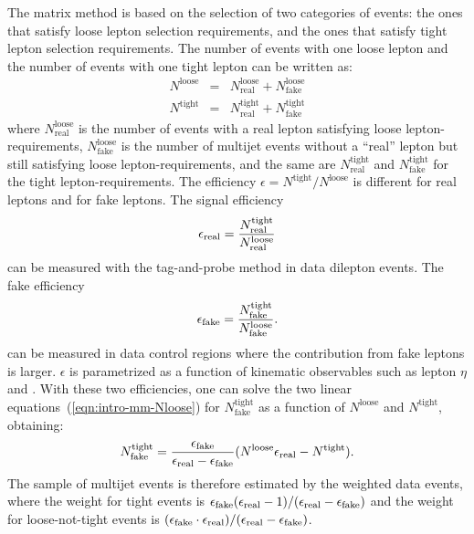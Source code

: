 The matrix method is based on the selection of two categories of
events: the ones that satisfy loose lepton selection requirements, and
the ones that satisfy tight lepton selection requirements.
The number of events with one loose lepton and
the number of events with one tight lepton can be written as:
%                                                                                             
\begin{eqnarray}
  N^\mathrm{loose}
  & = & N^\mathrm{loose}_\mathrm{real}
  + N^{\mathrm{loose}}_\mathrm{fake} \nonumber \\
  N^\mathrm{tight}
  & = & N^\mathrm{tight}_\mathrm{real}
  + N^{\mathrm{tight}}_\mathrm{fake}
  \label{eqn:intro-mm-Nloose}
\end{eqnarray}
%                                                                                             
where $N^\mathrm{loose}_\mathrm{real}$ is the number of events with a
real lepton satisfying loose lepton-requirements,
$N^\mathrm{loose}_\mathrm{fake}$ is the number of multijet events
without a ``real'' lepton but still satisfying loose
lepton-requirements, and the same are $N^\mathrm{tight}_\mathrm{real}$
and $N^\mathrm{tight}_\mathrm{fake}$ for the tight
lepton-requirements. The efficiency
$\epsilon=N^\mathrm{tight}/N^\mathrm{loose}$ is different for real
leptons and for fake leptons. The signal efficiency
%                                                                                             
\begin{equation}
  \epsilon_{\mathrm{real}}{}
  = \frac{N^\mathrm{tight}_\mathrm{real}}{N^\mathrm{loose}_\mathrm{real}}
\end{equation}
can be measured with the tag-and-probe method in data dilepton events.
The fake efficiency
\begin{equation}
  \epsilon_{\mathrm{fake}}{}
  = \frac{N^\mathrm{tight}_\mathrm{fake}}{N^\mathrm{loose}_\mathrm{fake}}.
  \label{eqn:intro-mm-real-fake}
\end{equation}
can be measured in data control regions where the contribution from
fake leptons is larger. $\epsilon$ is parametrized as a
function of kinematic observables such as lepton $\eta$ and . With these
two efficiencies, one can solve the two linear
equations~(\ref{eqn:intro-mm-Nloose}) for
$N^{\mathrm{tight}}_\mathrm{fake}$ as a function of $N^\mathrm{loose}$
and $N^\mathrm{tight}$, obtaining:
%                                                                                             
\begin{equation}
  N^\mathrm{tight}_\mathrm{fake}
  = \frac{\epsilon_{\mathrm{fake}}{}}
  {\epsilon_{\mathrm{real}}{} - \epsilon_{\mathrm{fake}}{}}
  (N^\mathrm{loose} \epsilon_{\mathrm{real}}{} - N^\mathrm{tight}).
  \label{eqn:intro-mm-tight_fake}
\end{equation}
%                                                                                             
The sample of multijet events is therefore estimated by the weighted
data events, where the weight for tight events is
$\epsilon_{\mathrm{fake}}{}(\epsilon_{\mathrm{real}}{}-1)/(\epsilon_{\mathrm{real}}{}-\epsilon_{\mathrm{fake}}{})$
and the weight for loose-not-tight events is
$(\epsilon_{\mathrm{fake}}{}\cdot{}\epsilon_{\mathrm{real}}{})/(\epsilon_{\mathrm{real}}{}-\epsilon_{\mathrm{fake}}{})$.

